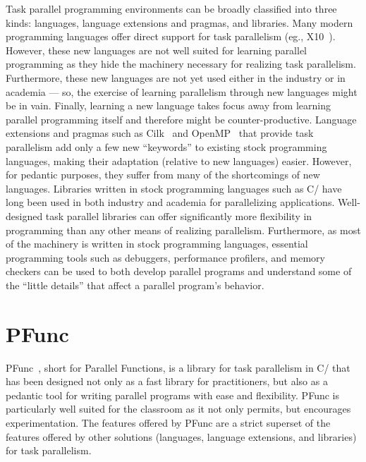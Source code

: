 \documentclass[9pt,twocolumn,letter]{article}
\begin{document}
Task parallel programming environments can be broadly classified into three
kinds: languages, language extensions and pragmas, and libraries.
Many modern programming languages offer direct support for task parallelism
(eg., X10~\cite{Charles:2005p1232}).
%
However, these new languages are not well suited for learning parallel
programming as they hide the machinery necessary for realizing task
parallelism.
%
Furthermore, these new languages are not yet used either in the industry or in
academia --- so, the exercise of learning parallelism through new languages 
might be in vain.
%
Finally, learning a new language takes focus away from learning parallel
programming itself and therefore might be counter-productive.
Language extensions and pragmas such as Cilk~\cite{FrigoLeRa98} and
OpenMP~\cite{kn:omp_30} that provide task parallelism add only a few new
``keywords'' to existing stock programming languages, making their adaptation
(relative to new languages) easier.
%
However, for pedantic purposes, they suffer from many of the shortcomings of
new languages.
Libraries written in stock programming languages such as C/\Cpp{} have long 
been used in both industry and academia for parallelizing applications.
%
Well-designed task parallel libraries can offer significantly more
flexibility in programming than any other means of realizing
parallelism.
%
Furthermore, as most of the machinery is written in stock programming
languages, essential programming tools such as debuggers, performance
profilers, and memory checkers can be used to both develop parallel programs
and understand some of the ``little details'' that affect a parallel program's
behavior.

%
%
%
\section{PFunc}
\label{sec:pfunc}
PFunc~\cite{kambadur09:pfunc}, short for Parallel Functions, is a library for
task parallelism in C/\Cpp{} that has been designed not only as a fast library
for practitioners, but also as a pedantic tool for writing parallel programs
with ease and flexibility.
%
PFunc is particularly well suited for the classroom as it not only permits, but
encourages experimentation.
%
The features offered by PFunc are a strict superset of the features offered by
other solutions (languages, language extensions, and libraries) for task
parallelism.
\end{document}
